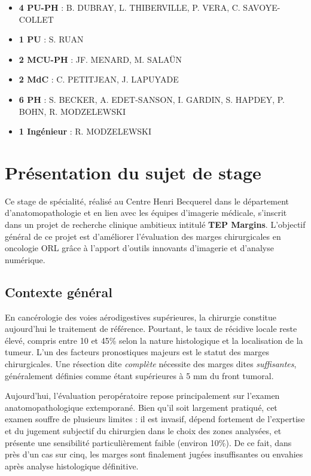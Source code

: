 \documentclass[11pt,a4paper]{report}
\begin{document}
\begin{itemize}
\item \textbf{4 PU-PH} : B. DUBRAY, L. THIBERVILLE, P. VERA, C. SAVOYE-COLLET
\item \textbf{1 PU} : S. RUAN
\item \textbf{2 MCU-PH} : JF. MENARD, M. SALAÜN
\item \textbf{2 MdC} : C. PETITJEAN, J. LAPUYADE
\item \textbf{6 PH} : S. BECKER, A. EDET-SANSON, I. GARDIN, S. HAPDEY, P. BOHN, R. MODZELEWSKI
\item \textbf{1 Ingénieur} : R. MODZELEWSKI
\end{itemize}

\section{Présentation du sujet de stage}

Ce stage de spécialité, réalisé au Centre Henri Becquerel dans le département d'anatomopathologie et en lien avec les équipes d'imagerie médicale, s'inscrit dans un projet de recherche clinique ambitieux intitulé \textbf{TEP Margins}. L'objectif général de ce projet est d'améliorer l'évaluation des marges chirurgicales en oncologie ORL grâce à l'apport d'outils innovants d'imagerie et d'analyse numérique.

\subsection{Contexte général}

En cancérologie des voies aérodigestives supérieures, la chirurgie constitue aujourd'hui le traitement de référence. Pourtant, le taux de récidive locale reste élevé, compris entre 10 et 45\% selon la nature histologique et la localisation de la tumeur. L'un des facteurs pronostiques majeurs est le statut des marges chirurgicales. Une résection dite \textit{complète} nécessite des marges dites \textit{suffisantes}, généralement définies comme étant supérieures à 5 mm du front tumoral.

Aujourd'hui, l'évaluation peropératoire repose principalement sur l'examen anatomopathologique extemporané. Bien qu'il soit largement pratiqué, cet examen souffre de plusieurs limites : il est invasif, dépend fortement de l'expertise et du jugement subjectif du chirurgien dans le choix des zones analysées, et présente une sensibilité particulièrement faible (environ 10\%). De ce fait, dans près d'un cas sur cinq, les marges sont finalement jugées insuffisantes ou envahies après analyse histologique définitive.
\end{document}
